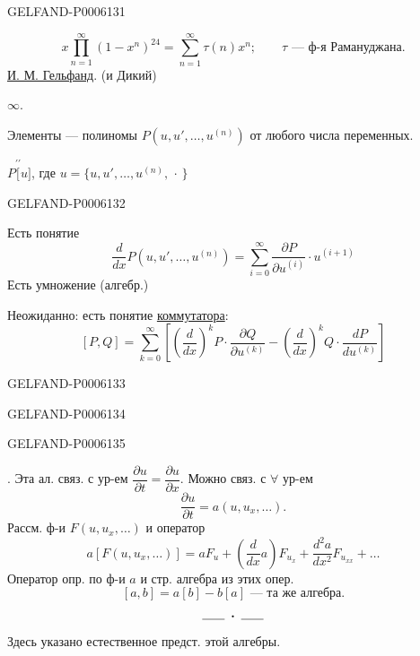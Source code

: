 \begin{GelfandAdjacentEvidence}{GELFAND-P000613}{1}
\qquad{}

\[
x\prod_{n=1}^\infty(1-x^n)^{24}=\sum_{n=1}^\infty\tau(n)x^n;
\qquad \tau\text{ — ф-я Рамануджана}.
\]
\underline{И. М. Гельфанд}. (и Дикий)

\(\infty\).

Элементы — полиномы \(P(u,u',\ldots,u^{(n)})\) от любого числа переменных.

\(P\overset{\prime\prime}{[}u]\), где \(u=\{u,u',\ldots,u^{(n)},\,\cdot\,\}\)
\end{GelfandAdjacentEvidence}
\begin{GelfandAdjacentEvidence}{GELFAND-P000613}{2}


Есть понятие
\[
\frac{d}{dx}P(u,u',\ldots,u^{(n)})
=\sum_{i=0}^\infty\frac{\partial P}{\partial u^{(i)}}\cdot u^{(i+1)}
\]
Есть умножение (алгебр.)

Неожиданно: есть понятие \underline{коммутатора}:
\[
[P,Q]=\sum_{k=0}^\infty
\left[\left(\frac{d}{dx}\right)^kP\cdot\frac{\partial Q}{\partial u^{(k)}}
-\left(\frac{d}{dx}\right)^kQ\cdot\frac{dP}{du^{(k)}}\right]
\]
\end{GelfandAdjacentEvidence}
\begin{GelfandAdjacentEvidence}{GELFAND-P000613}{3}

\end{GelfandAdjacentEvidence}
\begin{GelfandAdjacentEvidence}{GELFAND-P000613}{4}

\end{GelfandAdjacentEvidence}
\begin{GelfandAdjacentEvidence}{GELFAND-P000613}{5}


. Эта ал. связ. с ур-ем \(\dfrac{\partial u}{\partial t}=\dfrac{\partial u}{\partial x}\).
Можно связ. с \(\forall\) ур-ем
\[
\frac{\partial u}{\partial t}=a(u,u_x,\ldots).
\]
Рассм. ф-и \(F(u,u_x,\ldots)\) и оператор
\[
a[F(u,u_x,\ldots)]=aF_u+\left(\frac{d}{dx}a\right)F_{u_x}
+\frac{d^2a}{dx^2}F_{u_{xx}}+\ldots
\]
Оператор опр. по ф-и \(a\) и стр. алгебра из этих опер.
\[
[a,b]=a[b]-b[a]\text{ — та же алгебра}.
\]
\[\rule{1.8em}{.4pt}\;\boldsymbol{\cdot}\;\rule{1.8em}{.4pt}\]
Здесь указано естественное предст. этой алгебры.
\end{GelfandAdjacentEvidence}
